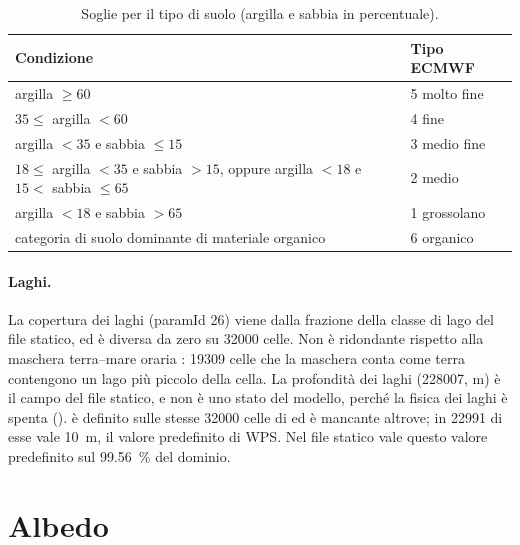 \begin{table}[htbp]
  \centering
  \small
  \caption{Soglie per il tipo di suolo  (argilla e sabbia in percentuale).}
  \label{tab:slt}
  \begin{tabular}{@{}ll@{}}
    \toprule
    Condizione & Tipo ECMWF \\
    \midrule
    argilla $\geq 60$ & 5 molto fine \\
    $35 \leq$ argilla $< 60$ & 4 fine \\
    argilla $< 35$ e sabbia $\leq 15$ & 3 medio fine \\
    $18 \leq$ argilla $< 35$ e sabbia $> 15$, oppure argilla $< 18$ e $15 <$ sabbia $\leq 65$ & 2 medio \\
    argilla $< 18$ e sabbia $> 65$ & 1 grossolano \\
    categoria di suolo dominante di materiale organico & 6 organico \\
    \bottomrule
  \end{tabular}
\end{table}

\paragraph{Laghi.} La copertura dei laghi  (paramId 26) viene dalla frazione della classe
di lago del file statico, ed è diversa da zero su \num{32000} celle. Non è ridondante rispetto alla
maschera terra--mare oraria : \num{19309} celle che la maschera conta come terra
contengono un lago più piccolo della cella. La profondità dei laghi  (228007, \si{m}) è il
campo  del file statico, e non è uno stato del modello, perché la fisica dei laghi è
spenta ().  è definito sulle stesse \num{32000} celle di
 ed è mancante altrove; in \num{22991} di esse vale \SI{10}{m}, il valore predefinito di
WPS. Nel file statico  vale questo valore predefinito sul \SI{99.56}{\percent} del
dominio.

\section{Albedo}
\label{sec:albedo}

